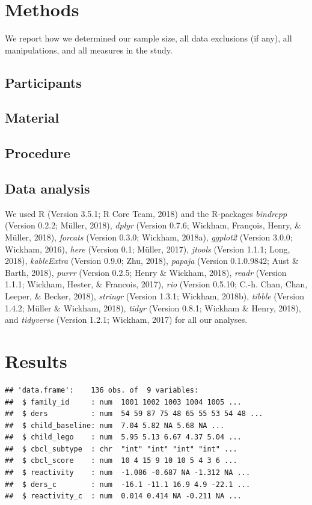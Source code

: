 \documentclass[man]{apa6}
\begin{document}
\section{Methods}\label{methods}

We report how we determined our sample size, all data exclusions (if
any), all manipulations, and all measures in the study.

\subsection{Participants}\label{participants}

\subsection{Material}\label{material}

\subsection{Procedure}\label{procedure}

\subsection{Data analysis}\label{data-analysis}

We used R (Version 3.5.1; R Core Team, 2018) and the R-packages
\emph{bindrcpp} (Version 0.2.2; Müller, 2018), \emph{dplyr} (Version
0.7.6; Wickham, François, Henry, \& Müller, 2018), \emph{forcats}
(Version 0.3.0; Wickham, 2018a), \emph{ggplot2} (Version 3.0.0; Wickham,
2016), \emph{here} (Version 0.1; Müller, 2017), \emph{jtools} (Version
1.1.1; Long, 2018), \emph{kableExtra} (Version 0.9.0; Zhu, 2018),
\emph{papaja} (Version 0.1.0.9842; Aust \& Barth, 2018), \emph{purrr}
(Version 0.2.5; Henry \& Wickham, 2018), \emph{readr} (Version 1.1.1;
Wickham, Hester, \& Francois, 2017), \emph{rio} (Version 0.5.10; C.-h.
Chan, Chan, Leeper, \& Becker, 2018), \emph{stringr} (Version 1.3.1;
Wickham, 2018b), \emph{tibble} (Version 1.4.2; Müller \& Wickham, 2018),
\emph{tidyr} (Version 0.8.1; Wickham \& Henry, 2018), and
\emph{tidyverse} (Version 1.2.1; Wickham, 2017) for all our analyses.

\section{Results}\label{results}

\begin{verbatim}
## 'data.frame':    136 obs. of  9 variables:
##  $ family_id     : num  1001 1002 1003 1004 1005 ...
##  $ ders          : num  54 59 87 75 48 65 55 53 54 48 ...
##  $ child_baseline: num  7.04 5.82 NA 5.68 NA ...
##  $ child_lego    : num  5.95 5.13 6.67 4.37 5.04 ...
##  $ cbcl_subtype  : chr  "int" "int" "int" "int" ...
##  $ cbcl_score    : num  10 4 15 9 10 10 5 4 3 6 ...
##  $ reactivity    : num  -1.086 -0.687 NA -1.312 NA ...
##  $ ders_c        : num  -16.1 -11.1 16.9 4.9 -22.1 ...
##  $ reactivity_c  : num  0.014 0.414 NA -0.211 NA ...
\end{verbatim}
\end{document}
